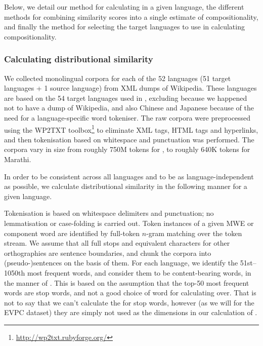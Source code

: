 \documentclass[output=paper,modfonts,nonflat]{langsci/langscibook}
\begin{document}
Below, we detail our method for calculating 
in a given language, the different methods for combining similarity
scores into a single estimate of compositionality, and finally the
method for selecting the target languages to use in calculating
compositionality.


\subsubsection{Calculating distributional similarity\label{sec:ds:calculating}}

We collected monolingual corpora for each of the 52 languages (51 target
languages + 1 source language) from XML dumps of Wikipedia. These
languages are based on the 54 target languages used in
, excluding  because we happened not to
have a dump of  Wikipedia, and also Chinese and Japanese
because of the need for a language-specific word tokeniser. The raw
corpora were preprocessed using the WP2TXT
toolbox\footnote{\smaller\url{http://wp2txt.rubyforge.org/}} to
eliminate XML tags, HTML tags and hyperlinks, and then tokenisation
based on whitespace and punctuation was performed. The corpora vary in
size from roughly 750M tokens for , to roughly 640K tokens for
Marathi.

In order to be consistent across all languages and to be as
language-indepen\-dent as possible, we calculate distributional
similarity in the following manner for a given language.

Tokenisation is based on whitespace delimiters and punctuation; no
lemmatisation or case-folding is carried out. Token instances of a
given MWE or component word are identified by full-token $n$-gram
matching over the token stream. We assume that all full stops and
equivalent characters for other orthographies are sentence boundaries,
and chunk the corpora into (pseudo-)sentences on the basis of
them. For each language, we identify the 51st--1050th most frequent
words, and consider them to be content-bearing words, in the manner of
\citet{Schutze:1997}. This is based on the assumption that the top-50
most frequent words are stop words, and not a good choice of word for
calculating  over. That is not to say that we
can't calculate the  for stop words, however
(as we will for the EVPC dataset) they are simply not used as the
dimensions in our calculation of .
\end{document}
